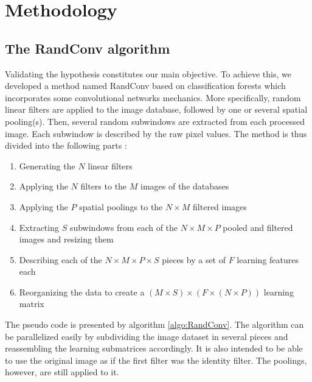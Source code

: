 \documentclass[a4paper]{report}
\begin{document}
\section{Methodology}
\subsection{The RandConv algorithm}
Validating the hypothesis constitutes our main objective. To achieve this, we developed a method named RandConv based on classification forests which incorporates some convolutional networks mechanics. More specifically, random linear filters are applied to the image database, followed by one or several spatial pooling(s). Then, several random subwindows are extracted from each processed image. Each subwindow is described by the raw pixel values. The method is thus divided into the following parts :
	
	\begin{enumerate}
		\item Generating the $N$ linear filters
		\item Applying the $N$ filters to the $M$ images of the databases
		\item Applying the $P$ spatial poolings to the $N \times M$ filtered images
		\item Extracting $S$ subwindows from each of the $N \times M \times P$ pooled and filtered images and resizing them
		\item Describing each of the $N \times M \times P \times S$ pieces by a set of $F$ learning features each
		\item Reorganizing the data to create a $(M \times S) \times (F \times (N \times P))$ learning matrix
	\end{enumerate}
	
	
	The pseudo code is presented by algorithm \ref{algo:RandConv}. The algorithm can be parallelized easily by subdividing the image dataset in several pieces and reassembling the learning submatrices accordingly. It is also intended to be able to use the original image as if the first filter was the identity filter. The poolings, however, are still applied to it.
	
\end{document}
